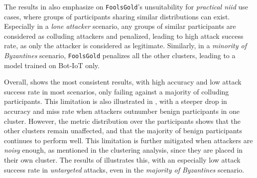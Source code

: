 The results in  also emphasize on \texttt{FoolsGold}'s unsuitability for \emph{practical \gls{niid}} use cases, where groups of participants sharing similar distributions can exist.
Especially in a \emph{lone attacker} scenario, any groups of similar participants are considered as colluding attackers and penalized, leading to high attack success rate, as only the attacker is considered as legitimate.
Similarly, in a \emph{minority of Byzantines} scenario, \texttt{FoolsGold} penalizes all the other clusters, leading to a model trained on Bot-IoT only.

Overall, \thecontrib shows the most consistent results, with high accuracy and low attack success rate in most scenarios, only failing against a majority of colluding participants.  
This limitation is also illustrated in , with a steeper drop in accuracy and miss rate when attackers outnumber benign participants in one cluster.
However, the metric distribution over the participants shows that the other clusters remain unaffected, and that the majority of benign participants continues to perform well.
This limitation is further mitigated when attackers are \emph{noisy} enough, as mentioned in the clustering analysis, since they are placed in their own cluster.
The results of  illustrates this, with an especially low attack success rate in \emph{untargeted} attacks, even in the \emph{majority of Byzantines} scenario. 








